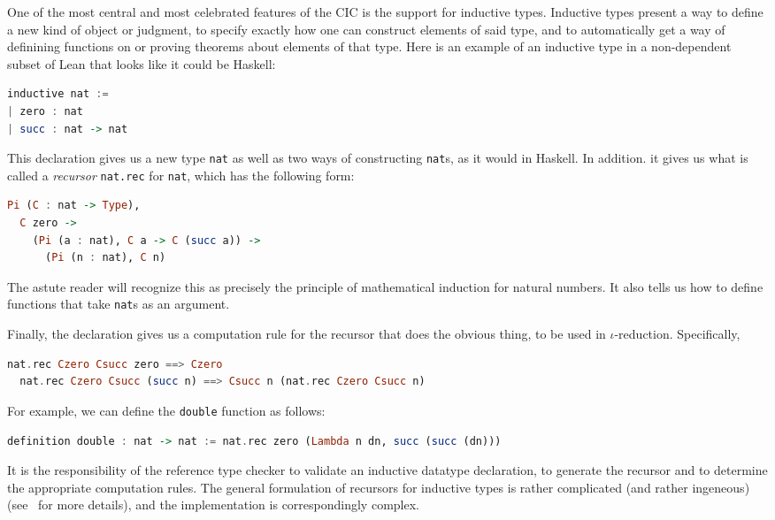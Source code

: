 \documentclass{article}
\begin{document}
\begin{spacing}{1.1}
One of the most central and most celebrated features of the CIC is the support for inductive types. Inductive types present a way to define a new kind of object or judgment, to specify exactly how one can construct elements of said type, and to automatically get a way of definining functions on or proving theorems about elements of that type. Here is an example of an inductive type in a non-dependent subset of Lean that looks like it could be Haskell:

\begin{lstlisting}[language=Haskell]
inductive nat :=
| zero : nat
| succ : nat -> nat
\end{lstlisting}

This declaration gives us a new type \lstinline{nat} as well as two ways of constructing \lstinline{nat}s, as it would in Haskell. In addition. it gives us what is called a \emph{recursor} \lstinline{nat.rec} for \lstinline{nat}, which has the following form:
\begin{lstlisting}[language=Haskell]
Pi (C : nat -> Type),
  C zero ->
    (Pi (a : nat), C a -> C (succ a)) ->
      (Pi (n : nat), C n)
\end{lstlisting}
The astute reader will recognize this as precisely the principle of mathematical induction for natural numbers. It also tells us how to define functions that take \lstinline{nat}s as an argument.

Finally, the declaration gives us a computation rule for the recursor that does the obvious thing, to be used in \( \iota \)-reduction. Specifically,
\begin{lstlisting}[language=Haskell]
  nat.rec Czero Csucc zero ==> Czero
  nat.rec Czero Csucc (succ n) ==> Csucc n (nat.rec Czero Csucc n)
\end{lstlisting}

For example, we can define the \lstinline{double} function as follows:
\begin{lstlisting}[language=Haskell]
definition double : nat -> nat := nat.rec zero (Lambda n dn, succ (succ (dn)))
\end{lstlisting}

It is the responsibility of the reference type checker to validate an inductive datatype declaration, to generate the recursor and to determine the appropriate computation rules. The general formulation of recursors for inductive types is rather complicated (and rather ingeneous) (see~\cite{dybjer1994inductive} for more details), and the implementation is correspondingly complex.


\end{spacing}
\end{document}
